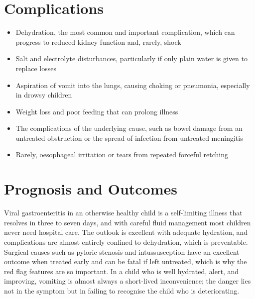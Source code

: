 \section*{Complications}
\begin{itemize}
    \item Dehydration, the most common and important complication, which can progress to reduced kidney function and, rarely, shock
    \item Salt and electrolyte disturbances, particularly if only plain water is given to replace losses
    \item Aspiration of vomit into the lungs, causing choking or pneumonia, especially in drowsy children
    \item Weight loss and poor feeding that can prolong illness
    \item The complications of the underlying cause, such as bowel damage from an untreated obstruction or the spread of infection from untreated meningitis
    \item Rarely, oesophageal irritation or tears from repeated forceful retching
\end{itemize}

\section*{Prognosis and Outcomes}
Viral gastroenteritis in an otherwise healthy child is a self-limiting illness that resolves in three to seven days, and with careful fluid management most children never need hospital care. The outlook is excellent with adequate hydration, and complications are almost entirely confined to dehydration, which is preventable. Surgical causes such as pyloric stenosis and intussusception have an excellent outcome when treated early and can be fatal if left untreated, which is why the red flag features are so important. In a child who is well hydrated, alert, and improving, vomiting is almost always a short-lived inconvenience; the danger lies not in the symptom but in failing to recognise the child who is deteriorating.

